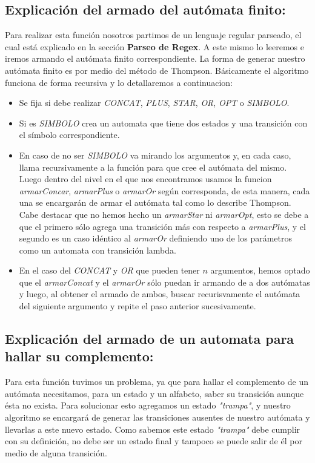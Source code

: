 \subsection{Explicación del armado del autómata finito:}
Para realizar esta función nosotros partimos de un lenguaje regular parseado, el cual está explicado en la sección \textbf{Parseo de Regex}. A este mismo lo leeremos e iremos armando el autómata finito correspondiente.
La forma de generar nuestro autómata finito es por medio del método de Thompson. Básicamente el algoritmo funciona de forma recursiva y lo detallaremos a continuacion:
\begin{itemize}
\item Se fija si debe realizar \textit{CONCAT}, \textit{PLUS}, \textit{STAR}, \textit{OR}, \textit{OPT} o \textit{SIMBOLO}.
\item Si es \textit{SIMBOLO} crea un automata que tiene dos estados y una transición con el símbolo correspondiente.
\item En caso de no ser \textit{SIMBOLO} va mirando los argumentos y, en cada caso, llama recursivamente a la función para que cree el autómata del mismo. Luego dentro del nivel en el que nos encontramos usamos la funcion \textit{armarConcar}, \textit{armarPlus} o \textit{armarOr} según corresponda, de esta manera, cada una se encargarán de armar el autómata tal como lo describe Thompson. Cabe destacar que no hemos hecho un \textit{armarStar} ni \textit{armarOpt}, esto se debe a que el primero sólo agrega una transición más con respecto a \textit{armarPlus}, y el segundo es un caso idéntico al \textit{armarOr} definiendo uno de los parámetros como un automata con transición lambda.
\item En el caso del \textit{CONCAT} y \textit{OR} que pueden tener $n$ argumentos, hemos optado que el \textit{armarConcat} y el \textit{armarOr} sólo puedan ir armando de a dos autómatas y luego, al obtener el armado de ambos, buscar recurisvamente el autómata del siguiente argumento y repite el paso anterior sucesivamente.
\end{itemize}


\subsection{Explicación del armado de un automata para hallar su complemento:}
Para esta función tuvimos un problema, ya que para hallar el complemento de un autómata necesitamos, para un estado y un alfabeto, saber su transición aunque ésta no exista. Para solucionar esto agregamos un estado \textit{"trampa"}, y nuestro algoritmo se encargará de generar las transiciones ausentes de nuestro autómata y llevarlas a este nuevo estado. Como sabemos este estado \textit{"trampa"} debe cumplir con su definición, no debe ser un estado final y tampoco se puede salir de él por medio de alguna transición. 

